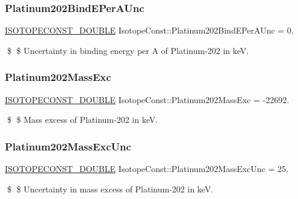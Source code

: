 \subsubsection{\texorpdfstring{Platinum202\+Bind\+E\+Per\+A\+Unc}{Platinum202BindEPerAUnc}}
{\footnotesize\ttfamily \mbox{\hyperlink{group___isotope_const-_macros_ga8f45a7272ce02c0b4c65c44636ed719a}{I\+S\+O\+T\+O\+P\+E\+C\+O\+N\+S\+T\+\_\+\+D\+O\+U\+B\+LE}} Isotope\+Const\+::\+Platinum202\+Bind\+E\+Per\+A\+Unc = 0.}

\$ \$ Uncertainty in binding energy per A of Platinum-\/202 in keV. \mbox{\label{group___isotope_const-_platinum-_pt202_ga10dc30d2ec3a103d313a6f3f0259221d}} 
\subsubsection{\texorpdfstring{Platinum202\+Mass\+Exc}{Platinum202MassExc}}
{\footnotesize\ttfamily \mbox{\hyperlink{group___isotope_const-_macros_ga8f45a7272ce02c0b4c65c44636ed719a}{I\+S\+O\+T\+O\+P\+E\+C\+O\+N\+S\+T\+\_\+\+D\+O\+U\+B\+LE}} Isotope\+Const\+::\+Platinum202\+Mass\+Exc = -\/22692.}

\$ \$ Mass excess of Platinum-\/202 in keV. \mbox{\label{group___isotope_const-_platinum-_pt202_ga6b03eabab7e995a1f0e2472e01d4bc06}} 
\subsubsection{\texorpdfstring{Platinum202\+Mass\+Exc\+Unc}{Platinum202MassExcUnc}}
{\footnotesize\ttfamily \mbox{\hyperlink{group___isotope_const-_macros_ga8f45a7272ce02c0b4c65c44636ed719a}{I\+S\+O\+T\+O\+P\+E\+C\+O\+N\+S\+T\+\_\+\+D\+O\+U\+B\+LE}} Isotope\+Const\+::\+Platinum202\+Mass\+Exc\+Unc = 25.}

\$ \$ Uncertainty in mass excess of Platinum-\/202 in keV. \mbox{\label{group___isotope_const-_platinum-_pt202_ga6b98097b2dfd235695bd232d03bfdb53}} 
